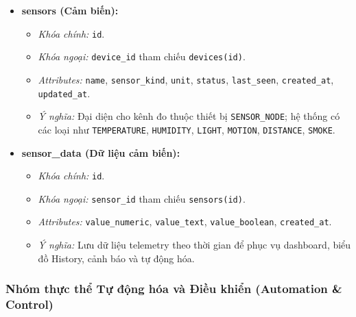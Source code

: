 \begin{itemize}
    \item \textbf{sensors (Cảm biến):}
    \begin{itemize}
        \item \textit{Khóa chính:} \texttt{id}.
        \item \textit{Khóa ngoại:} \texttt{device\_id} tham chiếu \texttt{devices(id)}.
        \item \textit{Attributes:} \texttt{name}, \texttt{sensor\_kind}, \texttt{unit}, \texttt{status}, \texttt{last\_seen}, \texttt{created\_at}, \texttt{updated\_at}.
        \item \textit{Ý nghĩa:} Đại diện cho kênh đo thuộc thiết bị \texttt{SENSOR\_NODE}; hệ thống có các loại như \texttt{TEMPERATURE}, \texttt{HUMIDITY}, \texttt{LIGHT}, \texttt{MOTION}, \texttt{DISTANCE}, \texttt{SMOKE}.
    \end{itemize}

    \item \textbf{sensor\_data (Dữ liệu cảm biến):}
    \begin{itemize}
        \item \textit{Khóa chính:} \texttt{id}.
        \item \textit{Khóa ngoại:} \texttt{sensor\_id} tham chiếu \texttt{sensors(id)}.
        \item \textit{Attributes:} \texttt{value\_numeric}, \texttt{value\_text}, \texttt{value\_boolean}, \texttt{created\_at}.
        \item \textit{Ý nghĩa:} Lưu dữ liệu telemetry theo thời gian để phục vụ dashboard, biểu đồ History, cảnh báo và tự động hóa.
    \end{itemize}
\end{itemize}

\subsubsection{Nhóm thực thể Tự động hóa và Điều khiển (Automation \& Control)}

